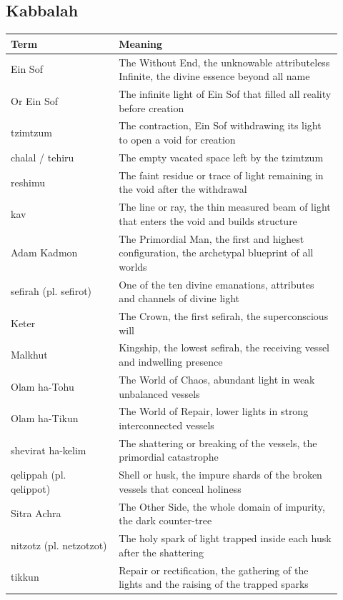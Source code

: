 
\subsection{Kabbalah}

\begin{longtable}{L{0.30\linewidth} L{0.62\linewidth}}
\toprule
\textbf{Term} & \textbf{Meaning} \\
\midrule
\endhead
Ein Sof & The Without End, the unknowable attributeless Infinite, the divine essence beyond all name \\
Or Ein Sof & The infinite light of Ein Sof that filled all reality before creation \\
tzimtzum & The contraction, Ein Sof withdrawing its light to open a void for creation \\
chalal / tehiru & The empty vacated space left by the tzimtzum \\
reshimu & The faint residue or trace of light remaining in the void after the withdrawal \\
kav & The line or ray, the thin measured beam of light that enters the void and builds structure \\
Adam Kadmon & The Primordial Man, the first and highest configuration, the archetypal blueprint of all worlds \\
sefirah (pl. sefirot) & One of the ten divine emanations, attributes and channels of divine light \\
Keter & The Crown, the first sefirah, the superconscious will \\
Malkhut & Kingship, the lowest sefirah, the receiving vessel and indwelling presence \\
Olam ha-Tohu & The World of Chaos, abundant light in weak unbalanced vessels \\
Olam ha-Tikun & The World of Repair, lower lights in strong interconnected vessels \\
shevirat ha-kelim & The shattering or breaking of the vessels, the primordial catastrophe \\
qelippah (pl. qelippot) & Shell or husk, the impure shards of the broken vessels that conceal holiness \\
Sitra Achra & The Other Side, the whole domain of impurity, the dark counter-tree \\
nitzotz (pl. netzotzot) & The holy spark of light trapped inside each husk after the shattering \\
tikkun & Repair or rectification, the gathering of the lights and the raising of the trapped sparks \\

\end{longtable}
